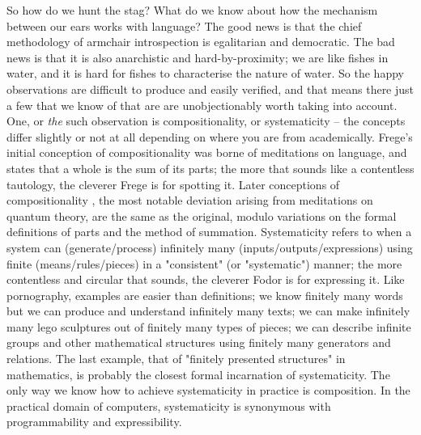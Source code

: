 So how do we hunt the stag? What do we know about how the mechanism between our ears works with language? The good news is that the chief methodology of armchair introspection is egalitarian and democratic. The bad news is that it is also anarchistic and hard-by-proximity; we are like fishes in water, and it is hard for fishes to characterise the nature of water. So the happy observations are difficult to produce and easily verified, and that means there just a few that we know of that are are unobjectionably worth taking into account. One, or \emph{the} such observation is compositionality, or systematicity -- the concepts differ slightly or not at all depending on where you are from academically. Frege's initial conception of compositionality \cite{} was borne of meditations on language, and states that a whole is the sum of its parts; the more that sounds like a contentless tautology, the cleverer Frege is for spotting it. Later conceptions of compositionality \cite{}, the most notable deviation arising from meditations on quantum theory, are the same as the original, modulo variations on the formal definitions of parts and the method of summation. Systematicity \cite{} refers to when a system can (generate/process) infinitely many (inputs/outputs/expressions) using finite (means/rules/pieces) in a "consistent" (or "systematic") manner; the more contentless and circular that sounds, the cleverer Fodor is for expressing it. Like pornography, examples are easier than definitions; we know finitely many words but we can produce and understand infinitely many texts; we can make infinitely many lego sculptures out of finitely many types of pieces; we can describe infinite groups and other mathematical structures using finitely many generators and relations. The last example, that of "finitely presented structures" in mathematics, is probably the closest formal incarnation of systematicity. The only way we know how to achieve systematicity in practice is composition. In the practical domain of computers, systematicity is synonymous with programmability and expressibility.\\


